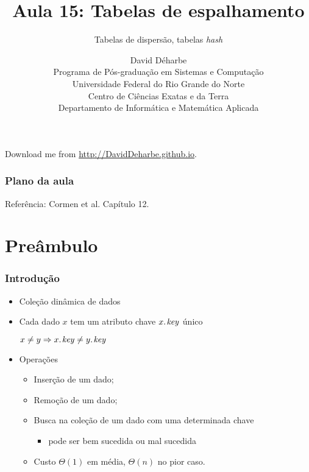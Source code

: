 \documentclass{beamer}
\title{Aula 15: Tabelas de espalhamento}
\subtitle{Tabelas de dispersão, tabelas \textit{hash\/}}
\author{David Déharbe \\
  Programa de Pós-graduação em Sistemas e Computação \\
  Universidade Federal do Rio Grande do Norte \\
  Centro de Ciências Exatas e da Terra \\
  Departamento de Informática e Matemática Aplicada}
\date{}
\begin{document}
\begin{frame}
  \titlepage
  Download me from \url{http://DavidDeharbe.github.io}.
\end{frame}

\begin{frame}
  \frametitle{Plano da aula}
  \tableofcontents

  \alert{Referência}: Cormen et al. Capítulo 12.
\end{frame}

\section{Preâmbulo}

\begin{frame}

  \frametitle{Introdução}

  \begin{itemize}

    \item Coleção dinâmica de dados

    \item Cada dado $x$ tem um atributo \alert{chave} $\attrib{x}{key}$
      \alert{único}

      $x \neq y \Rightarrow \attrib{x}{key} \neq \attrib{y}{key}$

    \item Operações

      \begin{itemize}

        \item Inserção de um dado;

        \item Remoção de um dado;

        \item Busca na coleção de um dado com uma determinada chave

          \begin{itemize}

            \item pode ser bem sucedida ou mal sucedida

          \end{itemize}

        \item Custo $\Theta(1)$ em média, $\Theta(n)$ no pior caso.

      \end{itemize}

  \end{itemize}

\end{frame}
\end{document}
